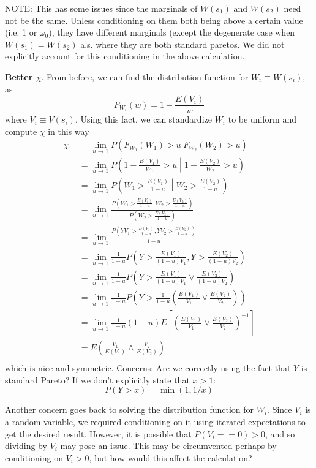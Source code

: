 \documentclass[12pt]{article}
\begin{document}
NOTE: This has some issues since the marginals of $W(s_1)$ and $W(s_2)$ need not be the same. Unless conditioning on them both being above a certain value (i.e. 1 or $\omega_0$), they have different marginals (except the degenerate case when $W(s_1)=W(s_2)$ a.s. where they are both standard paretos. We did not explicitly account for this conditioning in the above calculation.
\bigskip

\textbf{Better $\chi$}. From before, we can find the distribution function for $W_i\equiv W(s_i)$, as
\[ F_{W_i}(w) = 1 - \frac{E(V_i)}{w} \]
where $V_i\equiv V(s_i)$. Using this fact, we can standardize $W_i$ to be uniform and compute $\chi$ in this way
\begin{align*}
\chi_1 &= \lim_{u\rightarrow 1} P(F_{W_1}(W_1) > u | F_{W_2}(W_2) > u) \\
&= \lim_{u\rightarrow 1} P\left(1-\frac{E(V_1)}{W_1} > u \middle| 1-\frac{E(V_2)}{W_2} > u\right) \\
&= \lim_{u\rightarrow 1} P\left(W_1 > \frac{E(V_1)}{1-u} \middle| W_2 > \frac{E(V_2)}{1-u}\right) \\
&= \lim_{u\rightarrow 1} \frac{P\left(W_1 > \frac{E(V_1)}{1-u}, W_2 > \frac{E(V_2)}{1-u}\right)}{P\left(W_2 > \frac{E(V_2)}{1-u}\right)} \\
&= \lim_{u\rightarrow 1} \frac{P\left(YV_1 > \frac{E(V_1)}{1-u}, YV_2 > \frac{E(V_2)}{1-u}\right)}{1-u} \\
&= \lim_{u\rightarrow 1} \frac{1}{1-u}P\left(Y > \frac{E(V_1)}{(1-u)V_1}, Y > \frac{E(V_2)}{(1-u)V_2}\right) \\
&= \lim_{u\rightarrow 1} \frac{1}{1-u}P\left(Y > \frac{E(V_1)}{(1-u)V_1} \vee \frac{E(V_2)}{(1-u)V_2}\right) \\
&= \lim_{u\rightarrow 1} \frac{1}{1-u}P\left(Y > \frac{1}{1-u}\left(\frac{E(V_1)}{V_1} \vee \frac{E(V_2)}{V_2}\right)\right) \\
&= \lim_{u\rightarrow 1} \frac{1}{1-u}(1-u) E\left[\left(\frac{E(V_1)}{V_1} \vee \frac{E(V_2)}{V_2}\right)^{-1}\right] \\
&= E\left(\frac{V_1}{E(V_1)} \wedge \frac{V_2}{E(V_2)}\right) \\
\end{align*}
which is nice and symmetric. Concerns: Are we correctly using the fact that $Y$ is standard Pareto? If we don't explicitly state that $x>1$:
\[ P(Y > x) = \min(1, 1/x) \]

Another concern goes back to solving the distribution function for $W_i$. Since $V_i$ is a random variable, we required conditioning on it using iterated expectations to get the desired result. However, it is possible that $P(V_i == 0) > 0$, and so dividing by $V_i$ may pose an issue. This may be circumvented perhaps by conditioning on $V_i > 0$, but how would this affect the calculation?
\bigskip
\end{document}
